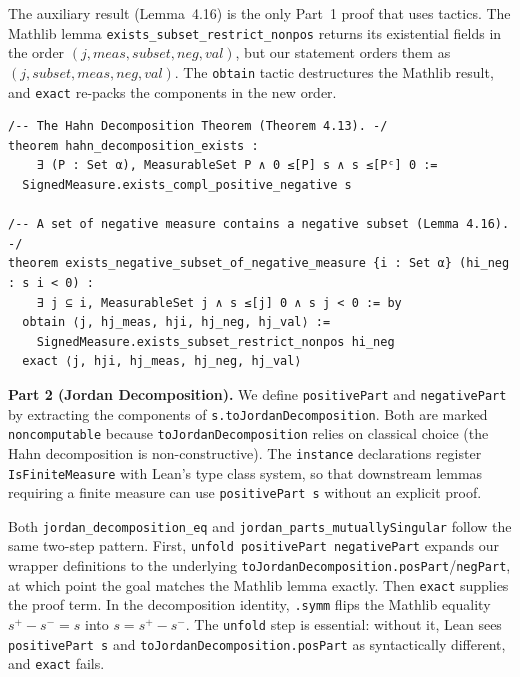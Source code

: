 \documentclass[11pt]{article}
\begin{document}
The auxiliary result (Lemma~4.16) is the only Part~1 proof that uses tactics. The Mathlib lemma \texttt{exists\_subset\_restrict\_nonpos} returns its existential fields in the order $(j, \mathit{meas}, \mathit{subset}, \mathit{neg}, \mathit{val})$, but our statement orders them as $(j, \mathit{subset}, \mathit{meas}, \mathit{neg}, \mathit{val})$. The \texttt{obtain} tactic destructures the Mathlib result, and \texttt{exact} re-packs the components in the new order.

\begin{verbatim}
/-- The Hahn Decomposition Theorem (Theorem 4.13). -/
theorem hahn_decomposition_exists :
    ∃ (P : Set α), MeasurableSet P ∧ 0 ≤[P] s ∧ s ≤[Pᶜ] 0 :=
  SignedMeasure.exists_compl_positive_negative s

/-- A set of negative measure contains a negative subset (Lemma 4.16). -/
theorem exists_negative_subset_of_negative_measure {i : Set α} (hi_neg : s i < 0) :
    ∃ j ⊆ i, MeasurableSet j ∧ s ≤[j] 0 ∧ s j < 0 := by
  obtain ⟨j, hj_meas, hji, hj_neg, hj_val⟩ :=
    SignedMeasure.exists_subset_restrict_nonpos hi_neg
  exact ⟨j, hji, hj_meas, hj_neg, hj_val⟩
\end{verbatim}

\medskip
\noindent
\textbf{Part 2 (Jordan Decomposition).}
We define \verb|positivePart| and \verb|negativePart| by extracting the components of \texttt{s.toJordanDecomposition}. Both are marked \texttt{noncomputable} because \texttt{toJordanDecomposition} relies on classical choice (the Hahn decomposition is non-constructive). The \texttt{instance} declarations register \texttt{IsFiniteMeasure} with Lean's type class system, so that downstream lemmas requiring a finite measure can use \texttt{positivePart~s} without an explicit proof.

Both \texttt{jordan\_decomposition\_eq} and \texttt{jordan\_parts\_mutuallySingular} follow the same two-step pattern. First, \texttt{unfold positivePart negativePart} expands our wrapper definitions to the underlying \texttt{toJordanDecomposition.posPart}/\texttt{negPart}, at which point the goal matches the Mathlib lemma exactly. Then \texttt{exact} supplies the proof term. In the decomposition identity, \texttt{.symm} flips the Mathlib equality $s^+ - s^- = s$ into $s = s^+ - s^-$. The \texttt{unfold} step is essential: without it, Lean sees \texttt{positivePart~s} and \texttt{toJordanDecomposition.posPart} as syntactically different, and \texttt{exact} fails.
\end{document}
